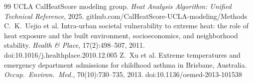 \documentclass[10pt]{article}
\begin{document}
\begin{thebibliography}{99}
 UCLA CalHeatScore modeling group. \emph{Heat Analysis Algorithm: Unified Technical Reference}, 2025. github.com/CalHeatScore-UCLA-modeling/Methods
 C.~K.~Uejio et al. Intra-urban societal vulnerability to extreme heat: the role of heat exposure and the built environment, socioeconomics, and neighborhood stability. \emph{Health \& Place}, 17(2):498--507, 2011. doi:10.1016/j.healthplace.2010.12.005
 Z.~Xu et al. Extreme temperatures and emergency department admissions for childhood asthma in Brisbane, Australia. \emph{Occup.\ Environ.\ Med.}, 70(10):730--735, 2013. doi:10.1136/oemed-2013-101538
\end{thebibliography}
\end{document}
